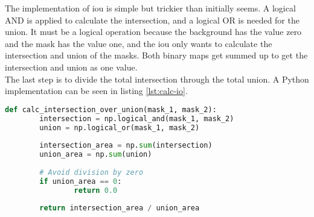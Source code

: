 		The implementation of \ac{iou} is simple but trickier than initially seems. A logical AND is applied to calculate the intersection, and a logical OR is needed for the union. It must be a logical operation because the background has the value zero and the mask has the value one, and the \ac{iou} only wants to calculate the intersection and union of the masks. Both binary maps get summed up to get the intersection and union as one value. \\
		The last step is to divide the total intersection through the total union. A Python implementation can be seen in listing \ref{lst:calc-io}.
		\begin{lstlisting}[language=Python,caption=Calculate the \acl{iou} between two single masks, label=lst:calc-io]
def calc_intersection_over_union(mask_1, mask_2):
		intersection = np.logical_and(mask_1, mask_2)
		union = np.logical_or(mask_1, mask_2)
		
		intersection_area = np.sum(intersection)
		union_area = np.sum(union)
		
		# Avoid division by zero
		if union_area == 0:
				return 0.0
		
		return intersection_area / union_area
		\end{lstlisting}
		
